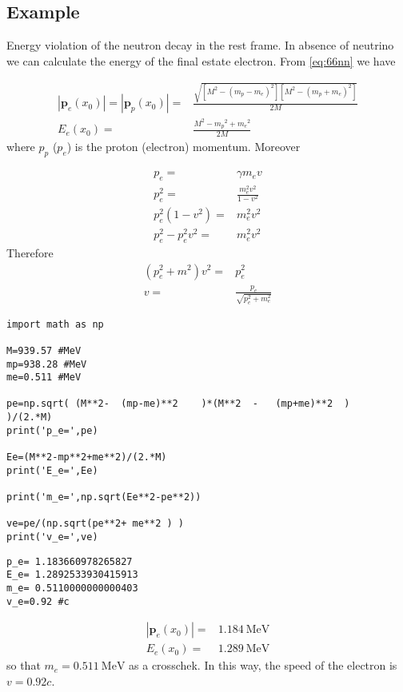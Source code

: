 \subsection{Example}
Energy violation of the neutron decay in the rest frame. In absence of neutrino we can calculate the energy of the final estate electron. From \eqref{eq:66nn} we have

\begin{align}
 |\mathbf{p}_e(x_0)|= |\mathbf{p}_p(x_0)|=&\frac{\sqrt{[M^2-({m_p}-{m_e})^2][M^2-({m_p}+{m_e})^2]}}{2M}\nonumber\\
E_e(x_0)=&  \frac{M^2-{m_p}^2+{m_e}^2}{2M}
\end{align}
where ${p}_p$ ($p_e$) is the proton (electron) momentum. Moreover

\begin{align*}
p_e=&\gamma m_e v\\
p_e^2 =&\frac{ m_e^2 v^2}{1-v^2}\\
p_e^2(1-v^2) =&m_e^2 v^2\\
p_e^2 -p_e^2v^2 =& m_e^2 v^2
\end{align*}
Therefore
\begin{align*}
  (p_e^2+ m^2 )v^2=&p_e^2\\
  v=&\frac{p_e}{\sqrt{p_e^2+ m_e^2 }}
\end{align*}


\begin{verbatim}
import math as np

M=939.57 #MeV
mp=938.28 #MeV
me=0.511 #MeV

pe=np.sqrt( (M**2-  (mp-me)**2    )*(M**2  -   (mp+me)**2  )    )/(2.*M)
print('p_e=',pe)

Ee=(M**2-mp**2+me**2)/(2.*M)
print('E_e=',Ee)

print('m_e=',np.sqrt(Ee**2-pe**2))

ve=pe/(np.sqrt(pe**2+ me**2 ) )
print('v_e=',ve)
\end{verbatim}

\begin{verbatim}
p_e= 1.183660978265827
E_e= 1.2892533930415913
m_e= 0.5110000000000403
v_e=0.92 #c
\end{verbatim}

\begin{align}
 |\mathbf{p}_e(x_0)|=& 1.184\ \text{MeV} \nonumber\\
E_e(x_0)=& 1.289\ \text{MeV}
\end{align}
so that $m_e=0.511\ \text{MeV}$ as a crosschek. In this way, the speed of the electron is $v=0.92c$. 

